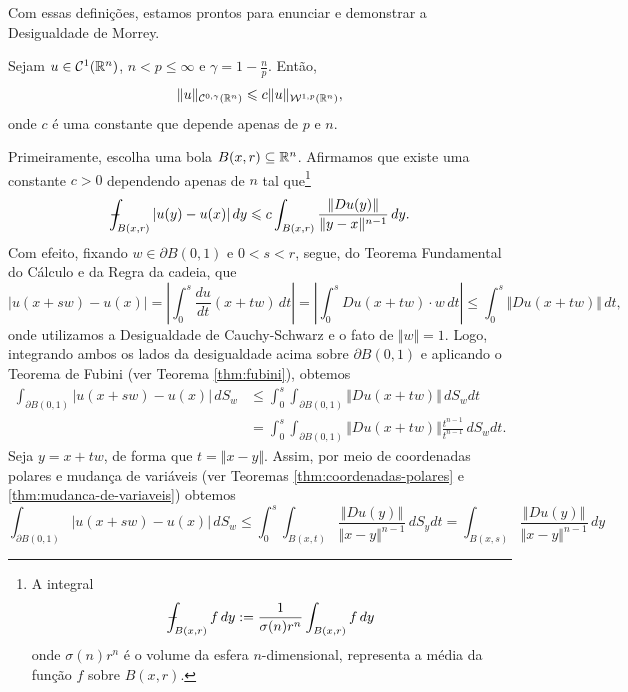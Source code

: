 Com essas definições, estamos prontos para enunciar e demonstrar a Desigualdade de Morrey.

\begin{tbox} \label{thm:holdersobolev1}
    Sejam $u \in \mathcal{C}^1(\mathbb{R}^n)$, $n < p \leqslant \infty$ e $\gamma = 1 - \frac{n}{p}$. Então,
    \[
        \Vert u \Vert_{\mathcal{C}^{0,\gamma}(\mathbb{R}^n)} \leqslant c \Vert u \Vert_{\mathcal{W}^{1,p}(\mathbb{R}^n)},
    \]
    onde $c$ é uma constante que depende apenas de $p$ e $n$.
\end{tbox}
\begin{prf}
    Primeiramente, escolha uma bola $B(x,r) \subseteq \mathbb{R}^n$.
    Afirmamos que existe uma constante $c > 0$ dependendo apenas de $n$ tal que\footnote{A integral
    \[
        -\!\!\!\!\!\!\int_{B(x,r)} f\,dy := \frac{1}{\sigma(n)r^n}\int_{B(x,r)} f \,dy
    \]
    onde $\sigma(n)r^n$ é o volume da esfera $n$-dimensional, representa a média da função $f$ sobre $B(x,r)$.}
    \begin{equation} \label{eq:desigualdade-uyux}
        -\!\!\!\!\!\!\int_{B(x,r)} |u(y) - u(x)| \,dy \leqslant c \int_{B(x,r)} \frac{\Vert Du(y) \Vert}{\Vert y - x \Vert^{n-1}} \,dy.
    \end{equation}
    Com efeito, fixando $w \in \partial B(0,1)$ e $0 < s < r$, segue, do Teorema Fundamental do Cálculo e da Regra da cadeia, que
    \[
        |u(x + sw) - u(x)| = \left| \int_0^s \frac{du}{dt} (x + tw) \,dt \right| = \left|\int_0^s Du(x + tw) \cdot w \,dt \right| \leqslant \int_0^s \Vert Du(x + tw) \Vert \,dt,
    \]
    onde utilizamos a Desigualdade de Cauchy-Schwarz e o fato de $\Vert w \Vert = 1$. Logo, integrando ambos os lados da desigualdade acima sobre $\partial B(0,1)$ e aplicando o Teorema de Fubini (ver Teorema \ref{thm:fubini}), obtemos
    \[
        \begin{aligned}
            \int_{\partial B(0,1)} |u(x + sw) - u(x)|\,dS_w &\leqslant  \int_0^s \int_{\partial B(0,1)} \Vert Du(x + tw) \Vert \,dS_wdt\\ 
            &= \int_0^s \int_{\partial B(0,1)} \Vert Du(x + tw) \Vert \frac{t^{n-1}}{t^{n-1}} \,dS_wdt.
        \end{aligned}
    \]
    Seja $y = x + tw$, de forma que $t = \Vert x - y \Vert$. Assim, por meio de coordenadas polares e mudança de variáveis (ver Teoremas \ref{thm:coordenadas-polares} e \ref{thm:mudanca-de-variaveis}) obtemos
    \[
        \int_{\partial B(0,1)} |u(x + sw) - u(x)|\,dS_w \leqslant \int_0^s \int_{B(x,t)} \frac{\Vert Du(y) \Vert}{\Vert x - y \Vert^{n-1}} \,dS_ydt =  \int_{B(x,s)} \frac{\Vert Du(y) \Vert}{\Vert x - y \Vert^{n-1}} \,dy
\]
\end{prf}

